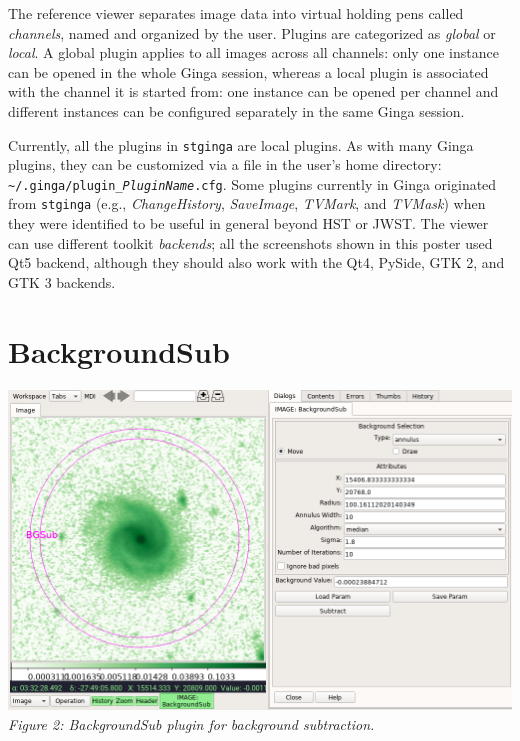 \documentclass[]{article}
\begin{document}
\begin{multicols}{3}
\para
The reference viewer separates image data into virtual holding pens
called \emph{channels}, named and organized by the user.
Plugins are categorized as \emph{global} or \emph{local}.  A global
plugin applies to all images across all channels: only one instance can
be opened in the whole Ginga session, whereas a local plugin is
associated with the channel it is started from: one instance can be
opened per channel and different instances can be configured separately
in the same Ginga session.

\para
Currently, all the plugins in {\tt stginga} are local plugins.
As with many Ginga plugins, they can be customized via a file in the
user's home directory:
{\tt \textasciitilde/.ginga/plugin\_{\em PluginName}.cfg}.
Some plugins currently in Ginga originated from {\tt stginga}
(e.g., {\em ChangeHistory}, {\em SaveImage}, {\em TVMark}, and {\em TVMask})
when they were identified to be useful in general beyond HST or JWST.
The viewer can use different toolkit \emph{backends};
all the screenshots shown in this poster used Qt5 backend, although they should
also work with the Qt4, PySide, GTK 2, and GTK 3 backends.

\section*{BackgroundSub}

\begin{center}
\includegraphics[width=8in]{plugin_backgroundsub} \\
\vspace*{0.4em}
\label{fig:plugin_backgroundsub}
{\small\em Figure 2: BackgroundSub plugin for background subtraction.}
\end{center}


\end{multicols}
\end{document}
